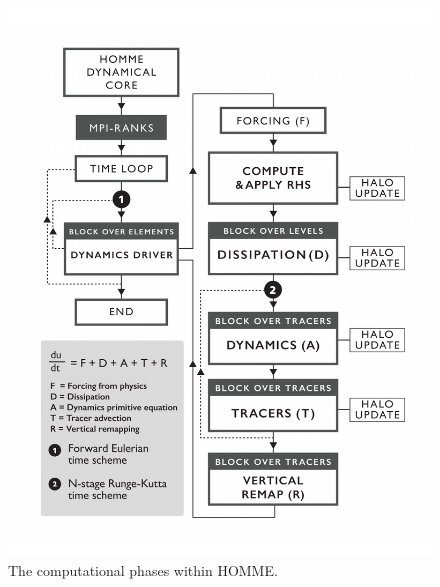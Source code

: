 \begin{figure}[tbp]
 \begin{center}
\includegraphics[width=12.0cm]{figures/HOMME-v01.pdf}
\end{center}
\caption{The computational phases within HOMME.}
\label{fig:homme-alg}
\end{figure}
